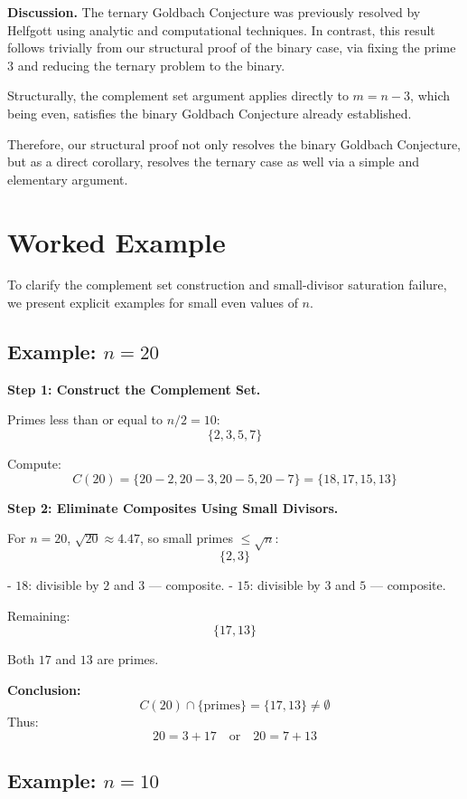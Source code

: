\documentclass[11pt]{article}
\begin{document}
	\textbf{Discussion.}  
	The ternary Goldbach Conjecture was previously resolved by Helfgott \cite{Helfgott2013} using analytic and computational techniques. In contrast, this result follows trivially from our structural proof of the binary case, via fixing the prime $3$ and reducing the ternary problem to the binary.
	
	Structurally, the complement set argument applies directly to $m = n - 3$, which being even, satisfies the binary Goldbach Conjecture already established.
	
	Therefore, our structural proof not only resolves the binary Goldbach Conjecture, but as a direct corollary, resolves the ternary case as well via a simple and elementary argument.
	
	
	
	\section{Worked Example}
	
	To clarify the complement set construction and small-divisor saturation failure, we present explicit examples for small even values of \( n \).
	
	\subsection*{Example: \( n = 20 \)}
	
	\textbf{Step 1: Construct the Complement Set.}
	
	Primes less than or equal to \( n/2 = 10 \):
	\[
	\{2, 3, 5, 7\}
	\]
	
	Compute:
	\[
	C(20) = \{20 - 2, 20 - 3, 20 - 5, 20 - 7\} = \{18, 17, 15, 13\}
	\]
	
	\textbf{Step 2: Eliminate Composites Using Small Divisors.}
	
	For \( n = 20 \), \(\sqrt{20} \approx 4.47\), so small primes \( \leq \sqrt{n} \):
	\[
	\{2, 3\}
	\]
	
	- \( 18 \): divisible by \( 2 \) and \( 3 \) — composite.
	- \( 15 \): divisible by \( 3 \) and \( 5 \) — composite.
	
	Remaining:
	\[
	\{17, 13\}
	\]
	
	Both \( 17 \) and \( 13 \) are primes.
	
	\textbf{Conclusion:}
	\[
	C(20) \cap \{\text{primes}\} = \{17, 13\} \neq \emptyset
	\]
	Thus:
	\[
	20 = 3 + 17 \quad \text{or} \quad 20 = 7 + 13
	\]
	
	\subsection*{Example: \( n = 10 \)}
	
\end{document}

